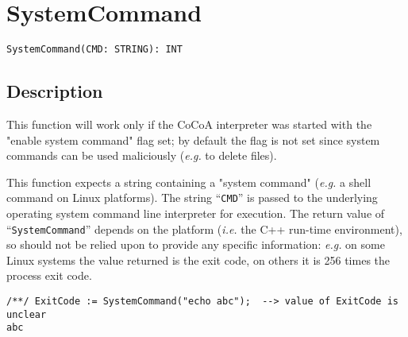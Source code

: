 \documentclass[a4paper]{mybook}
\newenvironment{command}{}{} %
\begin{document}
\section{SystemCommand}
\label{SystemCommand}
\begin{command} %


\begin{Verbatim}[label=syntax, rulecolor=\color{MidnightBlue},
frame=single]
SystemCommand(CMD: STRING): INT
\end{Verbatim}


\subsection*{Description}

This function will work only if the CoCoA interpreter was started with
the "enable system command" flag set; by default the flag is not set
since system commands can be used maliciously (\textit{e.g.} to delete files).
\par 
This function expects a string containing a "system command" (\textit{e.g.} a
shell command on Linux platforms).  The string ``\verb&CMD&'' is passed to the
underlying operating system command line interpreter for execution.
The return value of ``\verb&SystemCommand&'' depends on the platform (\textit{i.e.} the
C++ run-time environment), so should not be relied upon to provide
any specific information: \textit{e.g.} on some Linux systems the value returned
is the exit code, on others it is 256 times the process exit code.
\begin{Verbatim}[label=example, rulecolor=\color{PineGreen}, frame=single]
/**/ ExitCode := SystemCommand("echo abc");  --> value of ExitCode is unclear
abc
\end{Verbatim}


\end{command} %
\end{document}
